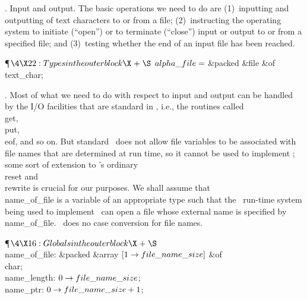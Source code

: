 .  Input and output.
The basic operations we need to do are
(1)~inputting and outputting of text characters to or from a file;
(2)~instructing the operating system to initiate (``open'')
or to terminate (``close'') input or output to or from a specified file; and
(3)~testing whether the end of an input file has been reached.

\Y\P$\4\X22:Types in the outer block\X\mathrel{+}\S$\6
$\\{alpha\_file}=$\1\5
\&{packed} \&{file} \1\&{of}\5
\\{text\_char};\2\2\par
\fi

.
Most of what we need to do with respect to input and output can be handled
by the I/O facilities that are standard in \PASCAL, i.e., the routines
called \\{get}, \\{put}, \\{eof}, and so on. But
standard \PASCAL\ does not allow file variables to be associated with file
names that are determined at run time, so it cannot be used to implement
\BibTeX; some sort of extension to \PASCAL's ordinary \\{reset} and \\{rewrite}
is crucial for our purposes. We shall assume that \\{name\_of\_file} is a
variable
of an appropriate type such that the \PASCAL\ run-time system being used to
implement \BibTeX\ can open a file whose external name is specified by
\\{name\_of\_file}. \BibTeX\ does no case conversion for file names.

\Y\P$\4\X16:Globals in the outer block\X\mathrel{+}\S$\6
\4\\{name\_of\_file}: \&{packed} \&{array} $[1\to\\{file\_name\_size}]$ %
\1\&{of}\5
\\{char};\2\6
\4\\{name\_length}: $0\to\\{file\_name\_size}$;\6
\4\\{name\_ptr}: $0\to\\{file\_name\_size}+1$;\par
\fi

